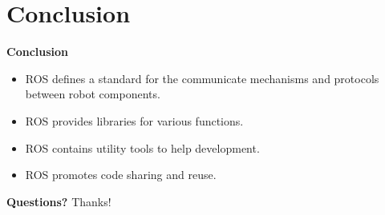 \documentclass[a4paper, 10pt, conference]{ieeeconf}       %
\begin{document}
\section{Conclusion}

\textbf{Conclusion}

\begin{itemize}
  \item ROS defines a standard for the communicate mechanisms and protocols between robot components.
  \item ROS provides libraries for various functions.
  \item ROS contains utility tools to help development.
  \item ROS promotes code sharing and reuse.
\end{itemize}

\textbf{Questions?}
Thanks!


  
\end{document}
